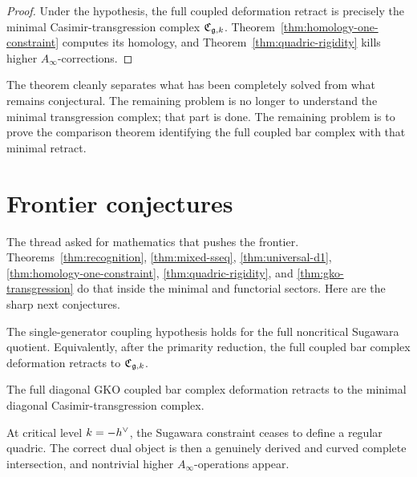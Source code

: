 \begin{proof}
Under the hypothesis, the full coupled deformation retract is precisely the minimal Casimir-transgression complex \(\mathfrak C_{\mathfrak g,k}\). Theorem~\ref{thm:homology-one-constraint} computes its homology, and Theorem~\ref{thm:quadric-rigidity} kills higher \(A_\infty\)-corrections.
\end{proof}

\begin{remark}
The theorem cleanly separates what has been completely solved from what remains conjectural. The remaining problem is no longer to understand the minimal transgression complex; that part is done. The remaining problem is to prove the comparison theorem identifying the full coupled bar complex with that minimal retract.
\end{remark}

\section{Frontier conjectures}

The thread asked for mathematics that pushes the frontier. Theorems~\ref{thm:recognition}, \ref{thm:mixed-sseq}, \ref{thm:universal-d1}, \ref{thm:homology-one-constraint}, \ref{thm:quadric-rigidity}, and \ref{thm:gko-transgression} do that inside the minimal and functorial sectors. Here are the sharp next conjectures.

\begin{conjecture}
The single-generator coupling hypothesis holds for the full noncritical Sugawara quotient. Equivalently, after the primarity reduction, the full coupled bar complex deformation retracts to \(\mathfrak C_{\mathfrak g,k}\).
\end{conjecture}

\begin{conjecture}
The full diagonal GKO coupled bar complex deformation retracts to the minimal diagonal Casimir-transgression complex.
\end{conjecture}

\begin{conjecture}
At critical level \(k=-h^\vee\), the Sugawara constraint ceases to define a regular quadric. The correct dual object is then a genuinely derived and curved complete intersection, and nontrivial higher \(A_\infty\)-operations appear.
\end{conjecture}

